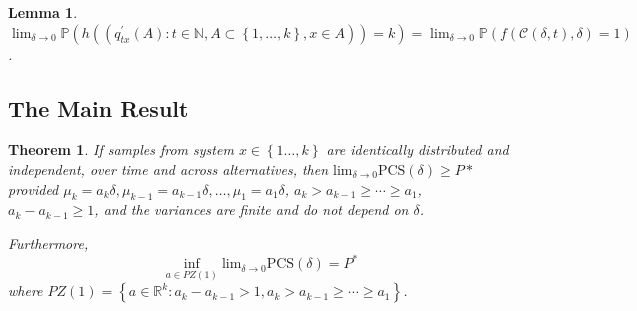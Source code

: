 \documentclass{wscpaperproc}
\theoremstyle{wsc}
\newtheorem{theorem}{Theorem}
\newtheorem{lemma}{Lemma}
\begin{document}
\begin{lemma}
    $\lim_{\delta\rightarrow0} \mathbb{P}\left( h\left( \left(q_{tx}^{'}\left(A\right):t\in\mathbb{N},A\subset\left\{ 1,\ldots,k\right\} ,x\in A\right) \right) =k\right) = \lim_{\delta\rightarrow0}
 \mathbb{P}\left(
 f\left(\mathcal{C}\left(\delta,t\right),\delta\right)=1
 \right)$.

\label{l:interpolation}
\end{lemma}




\subsection{The Main Result}

\begin{theorem}
\label{t:main}
If samples from system $x\in\left\{ 1\ldots,k\right\} $ are identically
distributed and independent, over time and across alternatives, then
$\mbox{lim}_{\delta\rightarrow0}\mbox{PCS}(\delta) \geq P*$
provided $\mu_{k}=a_{k}\delta,\mu_{k-1}=a_{k-1}\delta,\ldots,\mu_{1}=a_{1}\delta$,
$a_{k}>a_{k-1}\geq \cdots \geq a_{1}$, $a_{k}-a_{k-1}\ge1$, and the variances are finite and
do not depend on $\delta$.

Furthermore,
\[
\inf_{a\in PZ\left(1\right)}\mbox{lim}_{\delta\rightarrow0}\mbox{PCS}(\delta)=P^{*}
\]
where $PZ\left(1\right)=\left\{ a\in\mathbb{R}^{k}:a_{k}-a_{k-1}>1, a_{k}>a_{k-1}\geq \cdots \geq a_{1} \right\} $. 

\end{theorem}




%
\end{document}

